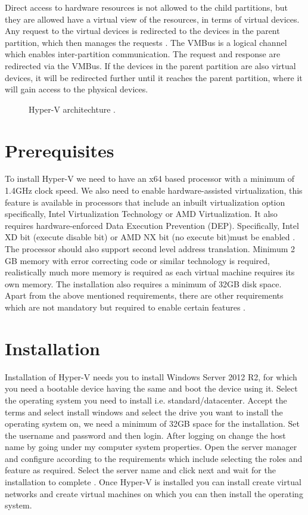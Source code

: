 \documentclass[9pt,twocolumn,twoside]{../../styles/osajnl}
\begin{document}
Direct access to hardware resources is not allowed to the child
partitions, but they are allowed have a virtual view of the resources,
in terms of virtual devices. Any request to the virtual devices is
redirected to the devices in the parent partition, which then manages
the requests \cite{www-hyperv-architecture}. The VMBus is a logical
channel which enables inter-partition communication. The request and
response are redirected via the VMBus. If the devices in the parent
partition are also virtual devices, it will be redirected further
until it reaches the parent partition, where it will gain access to
the physical devices.

\begin{figure}[htbp]
\centering
{}
\caption{Hyper-V architechture \cite{www-hyperv-wikipedia}.}
\label{fig:false-color}
\end{figure}

\section{Prerequisites}

To install Hyper-V we need to have an x64 based processor with a
minimum of 1.4GHz clock speed. We also need to enable
hardware-assisted virtualization, this feature is available in
processors that include an inbuilt virtualization option specifically,
Intel Virtualization Technology or AMD Virtualization. It also
requires hardware-enforced Data Execution Prevention
(DEP). Specifically, Intel XD bit (execute disable bit) or AMD NX bit
(no execute bit)must be enabled \cite{www-hyperv-paper2}. The
processor should also support second level address
translation. Minimum 2 GB memory with error correcting code or similar
technology is required, realistically much more memory is required as
each virtual machine requires its own memory. The installation also
requires a minimum of 32GB disk space. Apart from the above mentioned
requirements, there are other requirements which are not mandatory but
required to enable certain features \cite{www-hyperv-wikipedia}.

\section{Installation}

Installation of Hyper-V needs you to install Windows Server 2012 R2,
for which you need a bootable device having the same and boot the
device using it. Select the operating system you need to install
i.e. standard/datacenter.  Accept the terms and select install windows
and select the drive you want to install the operating system on, we
need a minimum of 32GB space for the installation. Set the username
and password and then login. After logging on change the host name by
going under my computer system properties. Open the server manager and
configure according to the requirements which include selecting the
roles and feature as required. Select the server name and click next
and wait for the installation to complete
\cite{www-hyperv-paper2}. Once Hyper-V is installed you can install
create virtual networks and create virtual machines on which you can
then install the operating system.
\end{document}
